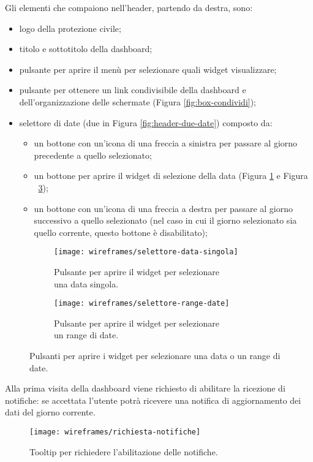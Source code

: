 \documentclass[../../../main.tex]{subfiles}
\begin{document}
Gli elementi che compaiono nell'header, partendo da destra, sono:
\begin{itemize}
    \item logo della protezione civile;
    \item titolo e sottotitolo della dashboard;
    \item pulsante per aprire il menù per selezionare quali widget visualizzare;
    \item pulsante per ottenere un link condivisibile della dashboard e dell'organizzazione delle schermate (Figura \ref{fig:box-condividi});
    \item selettore di date (due in Figura \ref{fig:header-due-date}) composto da:
    \begin{itemize}
        \item un bottone con un'icona di una freccia a sinistra per passare al giorno precedente a quello selezionato;
        \item un bottone per aprire il widget di selezione della data (Figura \ref{fig:selettore-data-singola} e Figura ~\ref{fig:selettore-range-date});
        \item un bottone con un'icona di una freccia a destra per passare al giorno successivo a quello selezionato (nel caso in cui il giorno selezionato sia quello corrente, questo bottone è disabilitato);
    \end{itemize}
\end{itemize}

\begin{figure}[H]
    \begin{subfigure}[b]{0.5\textwidth}
        \centering
        \texttt{[image: wireframes/selettore-data-singola]}
        \caption{Pulsante per aprire il widget per selezionare\\ una data singola.}\label{fig:selettore-data-singola}
    \end{subfigure}
\hfill
    \begin{subfigure}[b]{0.5\textwidth}
        \centering
        \texttt{[image: wireframes/selettore-range-date]}
        \caption{Pulsante per aprire il widget per selezionare\\un range di date.}\label{fig:selettore-range-date}
    \end{subfigure}
    \caption{Pulsanti per aprire i widget per selezionare una data o un range di date.}
\end{figure}

Alla prima visita della dashboard viene richiesto di abilitare la ricezione di notifiche: se accettata l'utente potrà ricevere una notifica di aggiornamento dei dati del giorno corrente.
\begin{figure}[H]
    \centering
    \texttt{[image: wireframes/richiesta-notifiche]}
    \caption{Tooltip per richiedere l'abilitazione delle notifiche.}\label{fig:richiesta-notifiche}
\end{figure}
\end{document}
